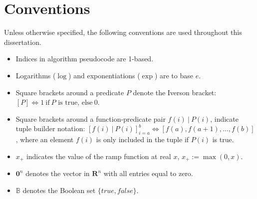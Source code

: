 \chapter*{Conventions}
Unless otherwise specified, the following conventions are used throughout this dissertation.

\begin{itemize}
  \item Indices in algorithm pseudocode are 1-based.
  \item Logarithms ($\log$) and exponentiations ($\exp$) are to base $e$.
  \item Square brackets around a predicate $P$ denote the Iverson bracket: $\left[P\right] \Leftrightarrow 1\ \mbox{if}\ P \mbox{ is true, else}\ 0$.
  \item Square brackets around a function-predicate pair $f(i)~|~P(i)$, indicate tuple builder notation: $\left[f(i)~|~P(i)\right]_{i=a}^b \Leftrightarrow \left[ f(a), f(a+1), \dots, f(b) \right]$, where an element $f(i)$ is only included in the tuple if $P(i)$ is true.
  \item $x_+$ indicates the value of the ramp function at real $x$, $x_+ := \max(0, x)$.
  \item $\mathbf{0}^n$ denotes the vector in $\mathbf{R}^n$ with all entries equal to zero.
  \item $\mathbb{B}$ denotes the Boolean set $\{true, false\}$.
\end{itemize}
